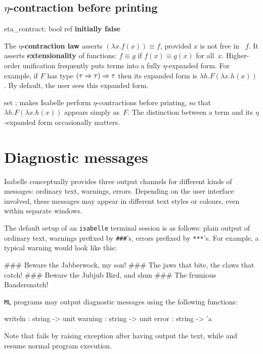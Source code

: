 \subsection{$\eta$-contraction before printing}
\begin{ttbox} 
eta_contract: bool ref \hfill{\bf initially false}
\end{ttbox}
The {\bf $\eta$-contraction law} asserts $(\lambda x.f(x))\equiv f$,
provided $x$ is not free in ~$f$.  It asserts {\bf extensionality} of
functions: $f\equiv g$ if $f(x)\equiv g(x)$ for all~$x$.  Higher-order
unification frequently puts terms into a fully $\eta$-expanded form.  For
example, if $F$ has type $(\tau\Rightarrow\tau)\Rightarrow\tau$ then its expanded form is
$\lambda h.F(\lambda x.h(x))$.  By default, the user sees this expanded
form.

\begin{ttdescription}
\item[set \ttindexbold{eta_contract};]
makes Isabelle perform $\eta$-contractions before printing, so that
$\lambda h.F(\lambda x.h(x))$ appears simply as~$F$.  The
distinction between a term and its $\eta$-expanded form occasionally
matters.
\end{ttdescription}

\section{Diagnostic messages}

Isabelle conceptually provides three output channels for different
kinds of messages: ordinary text, warnings, errors.  Depending on the
user interface involved, these messages may appear in different text
styles or colours, even within separate windows.

The default setup of an \texttt{isabelle} terminal session is as
follows: plain output of ordinary text, warnings prefixed by
\texttt{\#\#\#}'s, errors prefixed by \texttt{***}'s.  For example, a
typical warning would look like this:
\begin{ttbox}
\#\#\# Beware the Jabberwock, my son!
\#\#\# The jaws that bite, the claws that catch!
\#\#\# Beware the Jubjub Bird, and shun
\#\#\# The frumious Bandersnatch!
\end{ttbox}

\texttt{ML} programs may output diagnostic messages using the
following functions:
\begin{ttbox}
writeln : string -> unit
warning : string -> unit
error   : string -> 'a
\end{ttbox}
Note that  fails by raising exception 
after having output the text, while  and
 resume normal program execution.


